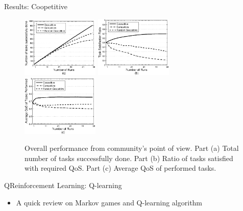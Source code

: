 \documentclass{beamer}
\begin{document}
\begin{frame}{Results: Coopetitive}
    \begin{figure}[h]
        \centering
        \includegraphics[width=1.45in]{figures/graphtaskdone.eps}
        \includegraphics[width=1.45in]{figures/graphtasksatisfaction.eps}
        \includegraphics[width=1.45in]{figures/graphavgqostask.eps}
        \caption{Overall performance from community's point of view. Part
        (a) Total number of tasks successfully done. Part (b) Ratio of
        tasks satisfied with required QoS. Part (c) Average QoS of
        performed tasks.} \label{graph_task}
    \end{figure}
\end{frame}

\begin{frame}{QReinforcement Learning: Q-learning}
    \begin{itemize}
        \item A quick review on Markov games and Q-learning algorithm
    \end{itemize}
\end{frame}
\end{document}
